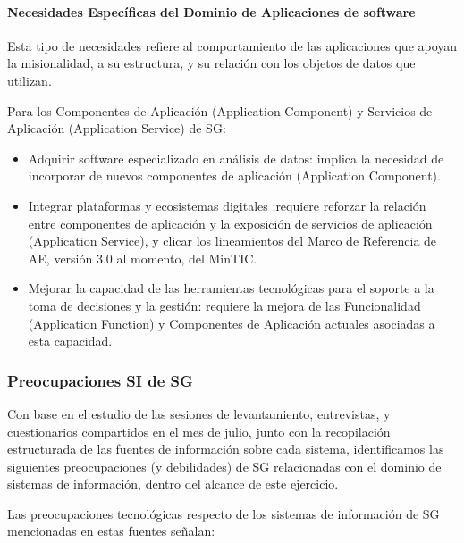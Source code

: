 \documentclass[
	a4paper, %
	12pt, %
]{include/CSSullivanBusinessReport}
\def\tightlist{}
\begin{document}
\paragraph{Necesidades Específicas del Dominio de Aplicaciones de
software}\label{sec:necesidades-especuxedficas-del-dominio-de-aplicaciones-de-software}

Esta tipo de necesidades refiere al comportamiento de las aplicaciones
que apoyan la misionalidad, a su estructura, y su relación con los
objetos de datos que utilizan.

Para los Componentes de Aplicación (Application Component) y Servicios
de Aplicación (Application Service) de SG:

\begin{itemize}
\tightlist
\item
  Adquirir software especializado en análisis de datos: implica la
  necesidad de incorporar de nuevos componentes de aplicación
  (Application Component).
\item
  Integrar plataformas y ecosistemas digitales :requiere reforzar la
  relación entre componentes de aplicación y la exposición de servicios
  de aplicación (Application Service), y clicar los lineamientos del
  Marco de Referencia de AE, versión 3.0 al momento, del MinTIC.
\item
  Mejorar la capacidad de las herramientas tecnológicas para el soporte
  a la toma de decisiones y la gestión: requiere la mejora de las
  Funcionalidad (Application Function) y Componentes de Aplicación
  actuales asociadas a esta capacidad.
\end{itemize}

\subsubsection{Preocupaciones SI de
SG}\label{sec:preocupaciones-si-de-sg}

Con base en el estudio de las sesiones de levantamiento, entrevistas, y
cuestionarios compartidos en el mes de julio, junto con la recopilación
estructurada de las fuentes de información sobre cada sistema,
identificamos las siguientes preocupaciones (y debilidades) de SG
relacionadas con el dominio de sistemas de información, dentro del
alcance de este ejercicio.

Las preocupaciones tecnológicas respecto de los sistemas de información
de SG mencionadas en estas fuentes señalan:
\end{document}
